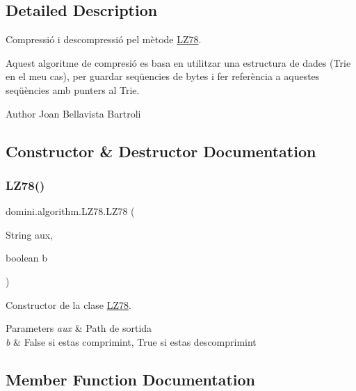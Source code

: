 \subsection{Detailed Description}
Compressió i descompressió pel mètode \hyperlink{classdomini_1_1algorithm_1_1LZ78}{L\+Z78}. 

Aquest algoritme de compresió es basa en utilitzar una estructura de dades (Trie en el meu cas), per guardar seqüencies de bytes i fer referència a aquestes seqüències amb punters al Trie.

\begin{DoxyAuthor}{Author}
Joan Bellavista Bartroli 
\end{DoxyAuthor}


\subsection{Constructor \& Destructor Documentation}
\mbox{\label{classdomini_1_1algorithm_1_1LZ78_afb5950cfc6a4887611298f6c1fd83d26}} 
\subsubsection{\texorpdfstring{L\+Z78()}{LZ78()}}
{\footnotesize\ttfamily domini.\+algorithm.\+L\+Z78.\+L\+Z78 (\begin{DoxyParamCaption}\item[{String}]{aux,  }\item[{boolean}]{b }\end{DoxyParamCaption})\hspace{0.3cm}{\ttfamily [inline]}}



Constructor de la clase \hyperlink{classdomini_1_1algorithm_1_1LZ78}{L\+Z78}. 


\begin{DoxyParams}{Parameters}
{\em aux} & Path de sortida \\
\hline
{\em b} & False si estas comprimint, True si estas descomprimint \\
\hline
\end{DoxyParams}


\subsection{Member Function Documentation}
\mbox{\label{classdomini_1_1algorithm_1_1LZ78_a545765a19a5eeababaeeee20fc480116}} 
